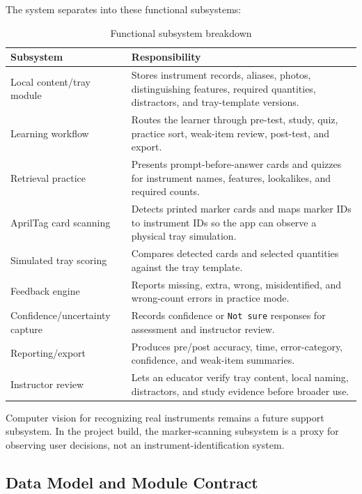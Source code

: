 \documentclass[10pt,a4paper]{article}
\begin{document}
The system separates into these functional subsystems:
\begin{table}[H]
\centering
\caption{Functional subsystem breakdown}
\label{tab:functional-subsystem-breakdown}
\small\renewcommand{\arraystretch}{1.2}\setlength{\tabcolsep}{4pt}
\begin{tabularx}{\textwidth}{|>{\raggedright\arraybackslash}X|>{\raggedright\arraybackslash}X|}
\hline
Subsystem & Responsibility \\
\hline
Local content/tray module & Stores instrument records, aliases, photos, distinguishing features, required quantities, distractors, and tray-template versions. \\
\hline
Learning workflow & Routes the learner through pre-test, study, quiz, practice sort, weak-item review, post-test, and export. \\
\hline
Retrieval practice & Presents prompt-before-answer cards and quizzes for instrument names, features, lookalikes, and required counts. \\
\hline
AprilTag card scanning & Detects printed marker cards and maps marker IDs to instrument IDs so the app can observe a physical tray simulation. \\
\hline
Simulated tray scoring & Compares detected cards and selected quantities against the tray template. \\
\hline
Feedback engine & Reports missing, extra, wrong, misidentified, and wrong-count errors in practice mode. \\
\hline
Confidence/uncertainty capture & Records confidence or \texttt{Not sure} responses for assessment and instructor review. \\
\hline
Reporting/export & Produces pre/post accuracy, time, error-category, confidence, and weak-item summaries. \\
\hline
Instructor review & Lets an educator verify tray content, local naming, distractors, and study evidence before broader use. \\
\hline
\end{tabularx}
\end{table}
Computer vision for recognizing real instruments remains a future support
subsystem. In the project build, the marker-scanning subsystem is a
proxy for observing user decisions, not an instrument-identification
system.
\subsection{Data Model and Module Contract}
\end{document}

